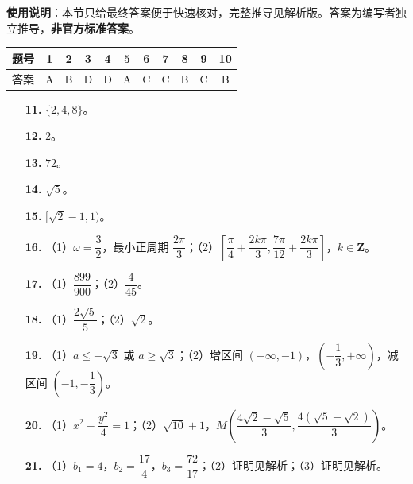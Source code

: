 
\begin{gknotice}
\textbf{使用说明}：本节只给最终答案便于快速核对，完整推导见解析版。答案为编写者独立推导，\textbf{非官方标准答案}。
\end{gknotice}

\begin{center}\begin{tabular}{ccccccccccc}
\toprule
题号 & 1 & 2 & 3 & 4 & 5 & 6 & 7 & 8 & 9 & 10 \\
\midrule
答案 & A & B & D & D & A & C & C & B & C & B \\
\bottomrule
\end{tabular}\end{center}

\begin{itemize}[leftmargin=2.6em]
  \item[\textbf{11.}] $\{2,4,8\}$。
  \item[\textbf{12.}] $2$。
  \item[\textbf{13.}] $72$。
  \item[\textbf{14.}] $\sqrt5$。
  \item[\textbf{15.}] $[\sqrt2-1,1)$。
\end{itemize}

\begin{itemize}[leftmargin=2.6em]
  \item[\textbf{16.}] （1）$\omega=\dfrac32$，最小正周期 $\dfrac{2\pi}3$；（2）$\left[\dfrac\pi4+\dfrac{2k\pi}3,\dfrac{7\pi}{12}+\dfrac{2k\pi}3\right]$，$k\in\mathbf Z$。
  \item[\textbf{17.}] （1）$\dfrac{899}{900}$；（2）$\dfrac4{45}$。
  \item[\textbf{18.}] （1）$\dfrac{2\sqrt5}5$；（2）$\sqrt2$。
  \item[\textbf{19.}] （1）$a\leqslant-\sqrt3$ 或 $a\geqslant\sqrt3$；（2）增区间 $(-\infty,-1)$，$\left(-\dfrac13,+\infty\right)$，减区间 $\left(-1,-\dfrac13\right)$。
  \item[\textbf{20.}] （1）$x^2-\dfrac{y^2}4=1$；（2）$\sqrt{10}+1$，$M\left(\dfrac{4\sqrt2-\sqrt5}3,\dfrac{4(\sqrt5-\sqrt2)}3\right)$。
  \item[\textbf{21.}] （1）$b_1=4$，$b_2=\dfrac{17}4$，$b_3=\dfrac{72}{17}$；（2）证明见解析；（3）证明见解析。
\end{itemize}
